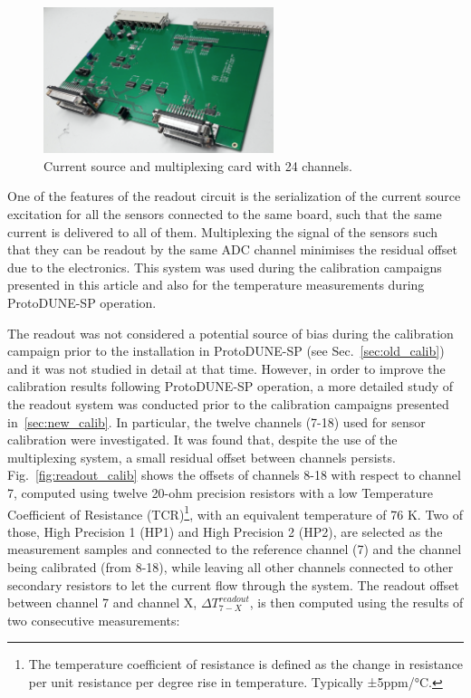\begin{figure}[htbp]
\centering
\includegraphics[width=0.6\textwidth]{./figure_2.png}
\caption{Current source and multiplexing card with 24 channels.
\label{fig:readout}}
\end{figure}

\noindent
One of the features of the readout circuit is the serialization of the current source excitation for all the sensors connected to the same board, such that the same current is delivered to all of them. Multiplexing the signal of the sensors such that they can be readout by the same ADC channel minimises the residual offset due to the electronics. This system was used during the calibration campaigns presented in this article and also for the temperature measurements during ProtoDUNE-SP operation.

The readout was not considered a potential source of bias during the calibration campaign prior to the installation in ProtoDUNE-SP (see Sec.~\ref{sec:old_calib}) and it was not studied in detail at that time. However, in order to improve the calibration results following ProtoDUNE-SP operation, a more detailed study of the readout system was conducted prior to the calibration campaigns presented in~\ref{sec:new_calib}. In particular, the twelve channels (7-18) used for sensor calibration were investigated. It was found that, despite the use of the multiplexing system, a small residual offset between channels persists. Fig.~\ref{fig:readout_calib} shows the offsets of channels 8-18 with respect to channel 7, computed using twelve 20-ohm precision resistors with a low Temperature Coefficient of Resistance (TCR)\footnote{The temperature coefficient of resistance is defined as the change in resistance per unit resistance per degree rise in temperature. Typically ±5ppm/°C.}, with an equivalent temperature of 76 K. Two of those, High Precision 1 (HP1) and High Precision 2 (HP2), are selected as the measurement samples and connected to the reference channel (7) and the channel being calibrated (from 8-18), while leaving all other channels connected to other secondary resistors to let the current flow through the system. The readout offset between channel 7 and channel X, $\Delta T_{7-X}^{readout}$, is then computed using the results of two consecutive measurements:

